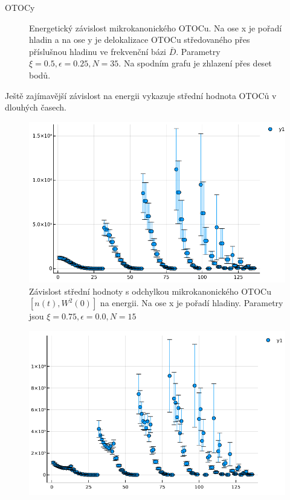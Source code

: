\documentclass{article}
\begin{document}
\begin{section}{OTOCy}
\begin{figure}[H]
\begin{subfigure}{.5\textwidth}
            \end{subfigure}
            \caption{Energetický závislost mikrokanonického OTOCu. Na ose x je pořadí hladin a na ose y je delokalizace OTOCu středovaného
            přes příslušnou hladinu ve frekvenční bázi $\bar{D}$. Parametry $\xi = 0.5, \epsilon = 0.25, N =35$. Na spodním grafu je zhlazení 
            přes deset bodů.}
            \end{figure}
  


            Ještě zajímavější závislost na energii vykazuje střední hodnota OTOCů v dlouhých časech. 


            \begin{figure}[H]
                \begin{center}
                    \includegraphics[width=12cm]{Mean 0.png}
                \end{center}
                
                \caption{Závislost střední hodnoty s odchylkou mikrokanonického 
                 OTOCu $[n(t),W^2(0)]$ na energii. Na ose x je pořadí hladiny. Parametry jsou $\xi = 0.75, \epsilon = 0.0, N = 15$}
            \end{figure}

            \begin{figure}[H]
                \begin{center}
                    \includegraphics[width=12cm]{Mean 0.03.png}
                \end{center}
                

\end{figure}
\end{section}
\end{document}
